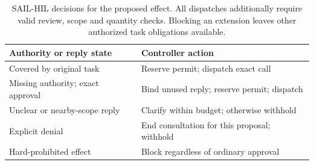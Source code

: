 \begin{table}[ht]
\centering\normalsize
\caption{SAIL-HIL decisions for the proposed effect. All dispatches additionally require valid review, scope and quantity checks. Blocking an extension leaves other authorized task obligations available.}
\label{tab:saildecisions}
\begin{tabularx}{\linewidth}{@{}>{\raggedright\arraybackslash}p{.43\linewidth}>{\raggedright\arraybackslash}X@{}}
\toprule
Authority or reply state & Controller action \\
\midrule
Covered by original task & Reserve permit; dispatch exact call \\
Missing authority; exact approval & Bind unused reply; reserve permit; dispatch \\
Unclear or nearby-scope reply & Clarify within budget; otherwise withhold \\
Explicit denial & End consultation for this proposal; withhold \\
Hard-prohibited effect & Block regardless of ordinary approval \\
\bottomrule
\end{tabularx}
\end{table}
